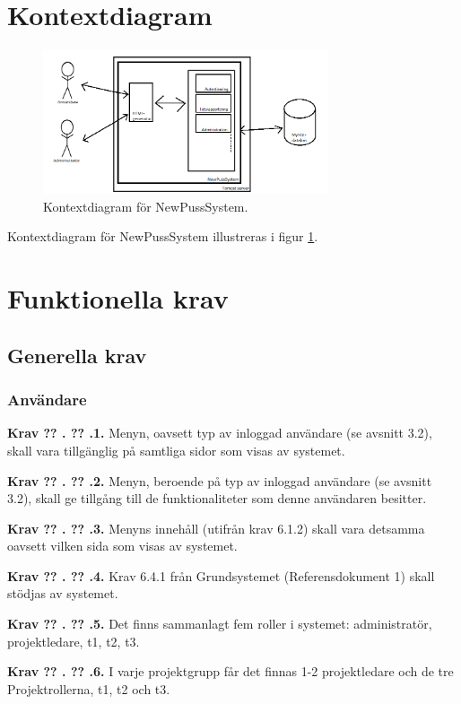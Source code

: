 \documentclass[a4paper]{article}
\newcommand\getcurrentref[1]{%
 \ifnumequal{\value{#1}}{0}
  {??}
  {\the\value{#1}}%
}
\newcommand\requirement[2]{
	\numberedrow{Krav}{#1}{#2}
}
\newcommand\numberedrow[3]{
	\noindent
	\textbf{#1 \getcurrentref{section}.\getcurrentref{subsection}.#2.} #3
	
}
\begin{document}
\section{Kontextdiagram}

\begin{figure}[H]
  \centering
    \includegraphics[width=0.75\textwidth]{context}
   \caption{Kontextdiagram för NewPussSystem.}
   \label{image_kontext}
\end{figure}
Kontextdiagram för NewPussSystem illustreras i figur \ref{image_kontext}.


\section{Funktionella krav}
	\subsection{Generella krav}
		\label{krav-funk-gen}
		\subsubsection*{Användare}
		\requirement{1}{Menyn, oavsett typ av inloggad användare (se avsnitt 3.2), skall vara tillgänglig på samtliga sidor som visas av systemet.}	
		\requirement{2}{Menyn, beroende på typ av inloggad användare (se avsnitt 3.2), skall ge tillgång till de funktionaliteter som denne användaren besitter.}
		\requirement{3}{Menyns innehåll (utifrån krav 6.1.2) skall vara detsamma oavsett vilken sida som visas av systemet.}
		\requirement{4}{Krav 6.4.1 från Grundsystemet (Referensdokument 1) skall stödjas av systemet.}
		\requirement{5}{Det finns sammanlagt fem roller i systemet: administratör, projektledare, t1, t2, t3.}
		\requirement{6}{I varje projektgrupp får det finnas 1-2 projektledare och de tre Projektrollerna, t1, t2 och t3.}
\end{document}
